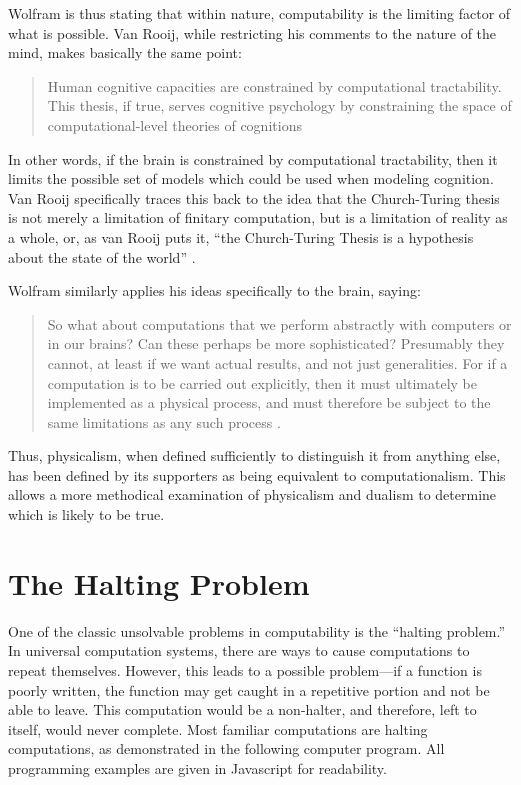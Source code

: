 Wolfram is thus stating that within nature, computability is the limiting factor of what is possible.  Van Rooij, while restricting his comments to the nature of the mind, makes basically the same point:

\begin{quote}
Human cognitive capacities are constrained by computational tractability.  This thesis, if true, serves cognitive psychology by constraining the space of computational-level theories of cognitions \citep[][p.~939]{vanrooij2008}
\end{quote}

In other words, if the brain is constrained by computational tractability, then it limits the possible set of models which could be used when modeling cognition.  Van Rooij specifically traces this back to the idea that the Church-Turing thesis is not merely a limitation of finitary computation, but is a limitation of reality as a whole, or, as van Rooij puts it, ``the Church-Turing Thesis is a hypothesis about the state of the world'' \citep[][p.~943]{vanrooij2008}.

Wolfram similarly applies his ideas specifically to the brain, saying:

\begin{quote}
So what about computations that we perform abstractly with computers or in our brains?  Can these perhaps be more sophisticated?  Presumably they cannot, at least if we want  actual results, and not just generalities.  For if a computation is to be carried out explicitly, then it must ultimately be implemented as a physical process, and must therefore be subject to the same limitations as any such process \citep[][p.~721]{wolfram2002}.
\end{quote}

Thus, physicalism, when defined sufficiently to distinguish it from anything else, has been defined by its supporters as being equivalent to computationalism.  This allows a more methodical examination of physicalism and dualism to determine which is likely to be true.

\section{The Halting Problem}

One of the classic unsolvable problems in computability is the ``halting problem.''  In universal computation systems, there are ways to cause computations to repeat themselves.  However, this leads to a possible problem---if a function is poorly written, the function may get caught in a repetitive portion and not be able to leave.  This computation would be a non-halter, and therefore, left to itself, would never complete.  Most familiar computations are halting computations, as demonstrated in the following computer program. All programming examples are given in Javascript for readability.

